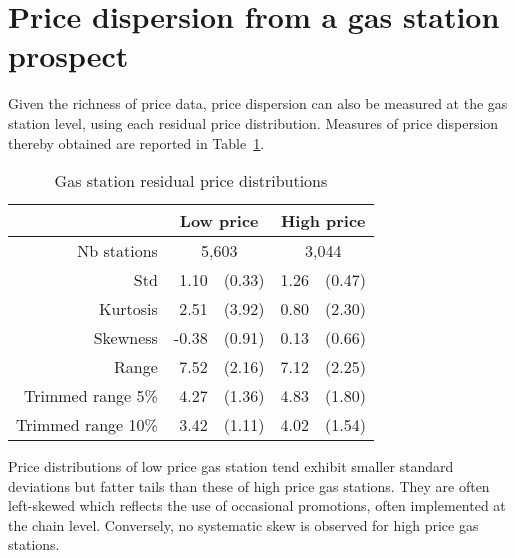 \documentclass[english]{article}
\begin{document}
\section{Price dispersion from a gas station prospect}

Given the richness of price data, price dispersion can also be measured at the gas station level, using each residual price distribution. Measures of price dispersion thereby obtained are reported in Table~\ref{tab:station_price_support_stats_des}.

\begin{table}[H]
  \caption{Gas station residual price distributions}
	\label{tab:station_price_support_stats_des}
\begin{tabular}{rrrrr}
\hline
\hline
      & \multicolumn{2}{c}{Low price} & \multicolumn{2}{c}{High price} \\
\hline
Nb stations & \multicolumn{2}{c}{5,603} & \multicolumn{2}{c}{3,044} \\
Std   & 1.10  & (0.33) & 1.26  & (0.47) \\
Kurtosis & 2.51  & (3.92) & 0.80  & (2.30) \\
Skewness & -0.38 & (0.91) & 0.13  & (0.66) \\
Range & 7.52  & (2.16) & 7.12  & (2.25) \\
Trimmed range 5\% & 4.27  & (1.36) & 4.83  & (1.80) \\
Trimmed range 10\% & 3.42  & (1.11) & 4.02  & (1.54) \\
\hline
\hline
\end{tabular}
\end{table}

Price distributions of low price gas station tend exhibit smaller standard deviations but fatter tails than these of high price gas stations. They are often left-skewed which reflects the use of occasional promotions, often implemented at the chain level. Conversely, no systematic skew is observed for high price gas stations.
\end{document}
